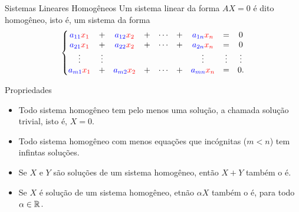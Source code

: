 \begin{frame}[label=sistemas]{Sistemas Lineares Homogêneos}
Um sistema linear da forma $AX=0$ é dito {\color{blue} homogêneo}, isto é, um sistema da forma
\[ \left\{\begin{matrix}
 {\color{blue}a_{11}}{\color{red}x_1} & + &  {\color{blue}a_{12}}{\color{red}x_2} & + & \cdots & + & {\color{blue}a_{1n}}{\color{red}x_n} & = & 0  \\
 {\color{blue}a_{21}}{\color{red}x_1} & + & {\color{blue}a_{22}}{\color{red}x_2} & + &   \cdots & + & {\color{blue}a_{2n}}{\color{red}x_n} & = & 0  \\
\vdots & \vdots  & & & &  & \vdots & \vdots & \vdots  \\
 {\color{blue}a_{m1}}{\color{red}x_1} & + & {\color{blue}a_{m2}}{\color{red}x_2} & + &  \cdots  & + &   {\color{blue}a_{mn}}{\color{red}x_n} & = & 0. 
\end{matrix}
\right.
\]

\end{frame}


\begin{frame}[label=sistemas]
\begin{block}{Propriedades}
\begin{itemize}
\item Todo sistema homogêneo {\color{red} tem pelo menos uma solução}, a chamada {\color{blue}solução trivial}, isto é, $X=0$.

\item Todo sistema homogêneo com menos equações que incógnitas ($m<n$) {\color{red}tem infintas soluções}.

\item Se $X$ e $Y$ são soluções de um sistema homogêneo, então $X+Y$ também o é.

\item Se $X$ é solução de um sistema homogêneo, etnão $\alpha X$ também o é, para todo $\alpha\in \mathbb{R}$.
\end{itemize}
\end{block}
\end{frame}






